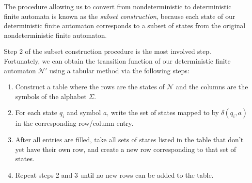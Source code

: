 The procedure allowing us to convert from nondeterministic to deterministic finite automata is known as the \emph{subset construction}, because each state of our deterministic finite automaton corresponds to a subset of states from the original nondeterministic finite automaton.

Step 2 of the subset construction procedure is the most involved step. Fortunately, we can obtain the transition function of our deterministic finite automaton $\mathcal{N}'$ using a tabular method via the following steps:
\begin{colouredbox}
\begin{enumerate}
\item Construct a table where the rows are the states of $\mathcal{N}$ and the columns are the symbols of the alphabet $\Sigma$.
\item For each state $q_{i}$ and symbol $a$, write the set of states mapped to by $\delta(q_{i}, a)$ in the corresponding row/column entry.
\item After all entries are filled, take all sets of states listed in the table that don't yet have their own row, and create a new row corresponding to that set of states.
\item Repeat steps 2 and 3 until no new rows can be added to the table.
\end{enumerate}
\end{colouredbox}

